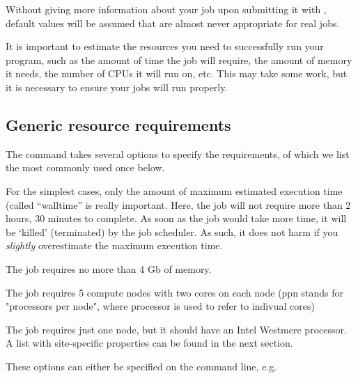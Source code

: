 Without giving more information about your job upon submitting it with
, default values will be assumed that are almost never appropriate
for real jobs.

It is important to estimate the resources you need to successfully run your
program, such as the amount of time the job will require, the amount of memory
it needs, the number of CPUs it will run on, etc. This may take some work, but
it is necessary to ensure your jobs will run properly.

\subsection{Generic resource requirements}

The  command takes several options to specify the requirements, of which we
list the most commonly used once below.

\begin{prompt}
\end{prompt}

For the simplest cases, only the amount of maximum estimated execution time
(called ``walltime'' is really important. Here, the job will not require more
than 2 hours, 30 minutes to complete. As soon as the job would take more time,
it will be `killed' (terminated) by the job scheduler.  As such, it does not
harm if you \emph{slightly} overestimate the maximum execution time.

\begin{prompt}
\end{prompt}

The job requires no more than 4 Gb of memory.

\begin{prompt}
\end{prompt}

The job requires 5 compute nodes with two cores on each node (ppn stands for
"processors per node", where processor is used to refer to indivual cores)

\ifantwerpen
\begin{prompt}
\end{prompt}

The job requires just one node, but it should have an Intel Westmere processor.
A list with site-specific properties can be found in the next section.

These options can either be specified on the command line, e.g.

